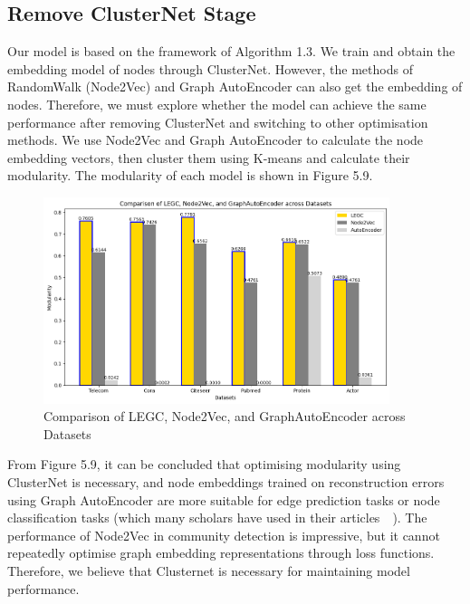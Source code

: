 \documentclass[ %
                    author={Tengyao Tu},
                supervisor={Dr. James Pope},
                    degree={MSc},
                     title={A New Perspective on Graph Community Detection: Combining Traditional Methods with Deep Learning Approaches},
                  subtitle={Applying to Telecom Networks and Diverse Datasets},
                      type={},
                      year={2024}]{dissertation}
\begin{document}
\subsection{Remove ClusterNet Stage}
Our model is based on the framework of Algorithm 1.3. We train and obtain the embedding model of nodes through ClusterNet. However, the methods of RandomWalk (Node2Vec) and Graph AutoEncoder can also get the embedding of nodes. Therefore, we must explore whether the model can achieve the same performance after removing ClusterNet and switching to other optimisation methods. We use Node2Vec and Graph AutoEncoder to calculate the node embedding vectors, then cluster them using K-means and calculate their modularity. The modularity of each model is shown in Figure 5.9.
\begin{figure}[h] %
    \centering
    \includegraphics[width=0.9\textwidth]{Figure_16.png} %
    \caption{Comparison of LEGC, Node2Vec, and GraphAutoEncoder across Datasets}
    \label{virtual Graph Data Map}
\end{figure}
From Figure 5.9, it can be concluded that optimising modularity using ClusterNet is necessary, and node embeddings trained on reconstruction errors using Graph AutoEncoder are more suitable for edge prediction tasks or node classification tasks (which many scholars have used in their articles~\cite{xie2021inductive}~\cite{guo2022multi}). The performance of Node2Vec in community detection is impressive, but it cannot repeatedly optimise graph embedding representations through loss functions. Therefore, we believe that Clusternet is necessary for maintaining model performance.
\end{document}
